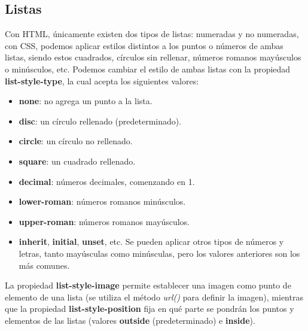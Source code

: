 \subsection{Listas}
Con HTML, únicamente existen dos tipos de listas: numeradas y no numeradas, con CSS, podemos aplicar estilos distintos a los puntos o números de ambas listas, siendo estos cuadrados, círculos sin rellenar, números romanos mayúsculos o minúsculos, etc. Podemos cambiar el estilo de ambas listas con la propiedad \textbf{list-style-type}, la cual acepta los siguientes valores:
\begin{itemize}
    \item \textbf{none}: no agrega un punto a la lista.
    \item \textbf{disc}: un círculo rellenado (predeterminado).
    \item \textbf{circle}: un círculo no rellenado.
    \item \textbf{square}: un cuadrado rellenado.
    \item \textbf{decimal}: números decimales, comenzando en 1.
    \item \textbf{lower-roman}: números romanos minúsculos.
    \item \textbf{upper-roman}: números romanos mayúsculos.
    \item \textbf{inherit}, \textbf{initial}, \textbf{unset}, etc. Se pueden aplicar otros tipos de números y letras, tanto mayúsculas como minúsculas, pero los valores anteriores son los más comunes.
\end{itemize}

La propiedad \textbf{list-style-image} permite establecer una imagen como punto de elemento de una lista (se utiliza el método \textit{url()} para definir la imagen), mientras que la propiedad \textbf{list-style-position} fija en qué parte se pondrán los puntos y elementos de las listas (valores \textbf{outside} (predeterminado) e \textbf{inside}).

